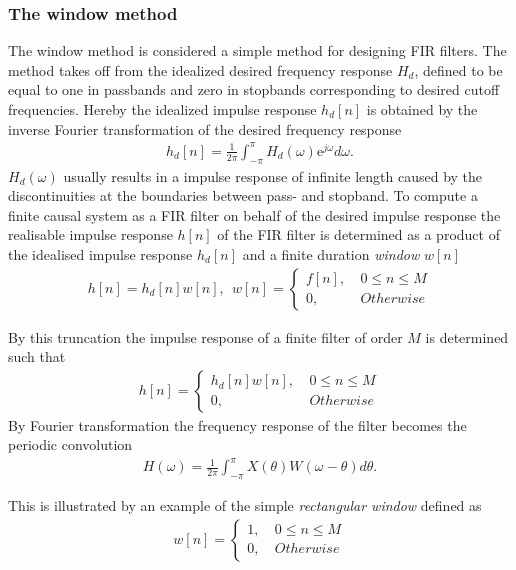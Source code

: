 \subsubsection{The window method}
The window method is considered a simple method for designing FIR filters. The method takes off from the idealized desired frequency response $H_d$, defined to be equal to one in passbands and zero in stopbands corresponding to desired cutoff frequencies. Hereby the idealized impulse response $h_d[n]$ is obtained by the inverse Fourier transformation of the desired frequency response
\begin{align}
h_d[n]=\frac{1}{2\pi}\int_{-\pi}^{\pi} H_d(\omega)\text{e}^{j\omega} d\omega.
\end{align}
$H_d(\omega)$ usually results in a impulse response of infinite length caused by the discontinuities at the boundaries between pass- and stopband. To compute a finite causal system as a FIR filter on behalf of the desired impulse response the realisable impulse response $h[n]$ of the FIR filter is determined as a product of the idealised impulse response $h_d[n]$ and a finite duration \textit{window} $w[n]$ 
\begin{align}
h[n]=h_d[n]w[n], \ \ w[n] =
\left\{ \begin{matrix}
f[n], &\ 0 \leq n \leq M \\
0, &\ Otherwise
\end{matrix}\right.
\end{align}

By this truncation the impulse response of a finite filter of order $M$ is determined such that 
\begin{align}
h[n]= 
\left\{ \begin{matrix}
h_d[n]w[n], &\ 0 \leq n \leq M \\
0, &\ Otherwise
\end{matrix}\right.
\end{align}
By Fourier transformation the frequency response of the filter becomes the periodic convolution 
\begin{align}
H(\omega)=\frac{1}{2\pi}\int_{-\pi}^{\pi} X(\theta)W(\omega-\theta)d\theta.
\end{align}

This is illustrated by an example of the simple \textit{rectangular window} defined as 
\begin{align}
w[n] =
\left\{ \begin{matrix}
1, &\ 0 \leq n \leq M \\
0, &\ Otherwise
\end{matrix}\right.
\end{align}

